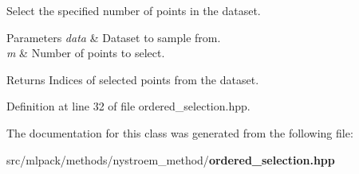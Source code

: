Select the specified number of points in the dataset. 


\begin{DoxyParams}{Parameters}
{\em data} & Dataset to sample from. \\
\hline
{\em m} & Number of points to select. \\
\hline
\end{DoxyParams}
\begin{DoxyReturn}{Returns}
Indices of selected points from the dataset. 
\end{DoxyReturn}


Definition at line 32 of file ordered\+\_\+selection.\+hpp.



The documentation for this class was generated from the following file\+:\begin{DoxyCompactItemize}
\item 
src/mlpack/methods/nystroem\+\_\+method/{\bf ordered\+\_\+selection.\+hpp}\end{DoxyCompactItemize}
